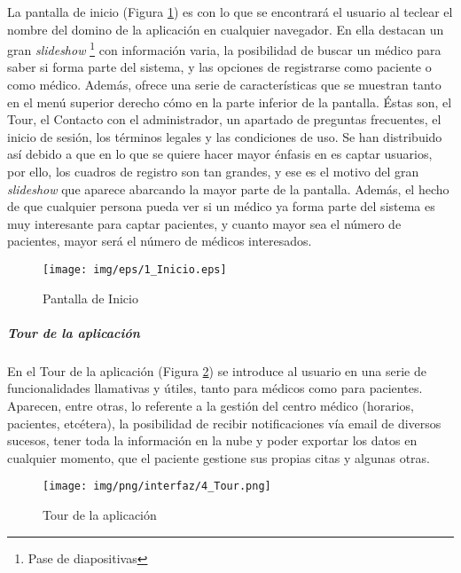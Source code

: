 \documentclass[a4paper,oneside,11pt]{book}
\begin{document}
		La pantalla de inicio (Figura \ref{fig:iu_pantalla_de_inicio}) es con lo que se encontrará el usuario al teclear el nombre del domino de la aplicación en cualquier navegador. En ella destacan un gran \textit{slideshow} \footnote{Pase de diapositivas} con información varia, la posibilidad de buscar un médico para saber si forma parte del sistema, y las opciones de registrarse como paciente o como médico. Además, ofrece una serie de características que se muestran tanto en el menú superior derecho cómo en la parte inferior de la pantalla. Éstas son, el Tour, el Contacto con el administrador, un apartado de preguntas frecuentes, el inicio de sesión, los términos legales y las condiciones de uso. Se han distribuido así debido a que en lo que se quiere hacer mayor énfasis en es captar usuarios, por ello, los cuadros de registro son tan grandes, y ese es el motivo del gran \textit{slideshow} que aparece abarcando la mayor parte de la pantalla. Además, el hecho de que cualquier persona pueda ver si un médico ya forma parte del sistema es muy interesante para captar pacientes, y cuanto mayor sea el número de pacientes, mayor será el número de médicos interesados.
	
		
		\begin{figure}[H]
		  \centering
		    \texttt{[image: img/eps/1\_Inicio.eps]}
		  \caption{Pantalla de Inicio}
		  \label{fig:iu_pantalla_de_inicio}
		\end{figure}
			
		\subparagraph{Tour de la aplicación} %
		\label{par:iu_tour_de_la_aplicacion}
		
		En el Tour de la aplicación (Figura \ref{fig:iu_tour}) se introduce al usuario en  una serie de funcionalidades llamativas y útiles, tanto para médicos como para pacientes. Aparecen, entre otras, lo referente a la gestión del centro médico (horarios, pacientes, etcétera), la posibilidad de recibir notificaciones vía email de diversos sucesos, tener toda la información en la nube y poder exportar los datos en cualquier momento, que el paciente gestione sus propias citas y algunas otras.
		
			\begin{figure}[H]
			  \centering
			    \texttt{[image: img/png/interfaz/4\_Tour.png]}
			  \caption{Tour de la aplicación}
			  \label{fig:iu_tour}
			\end{figure}
			
		
\end{document}
